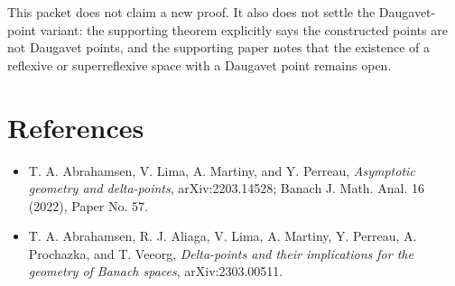 \documentclass[11pt]{article}
\begin{document}
This packet does not claim a new proof.  It also does not settle the
Daugavet-point variant: the supporting theorem explicitly says the constructed
points are not Daugavet points, and the supporting paper notes that the
existence of a reflexive or superreflexive space with a Daugavet point remains
open.

\section*{References}

\begin{itemize}
\item T. A. Abrahamsen, V. Lima, A. Martiny, and Y. Perreau,
\emph{Asymptotic geometry and delta-points}, arXiv:2203.14528; Banach J.
Math. Anal. 16 (2022), Paper No. 57.
\item T. A. Abrahamsen, R. J. Aliaga, V. Lima, A. Martiny, Y. Perreau,
A. Prochazka, and T. Veeorg, \emph{Delta-points and their implications for
the geometry of Banach spaces}, arXiv:2303.00511.
\end{itemize}
\end{document}

